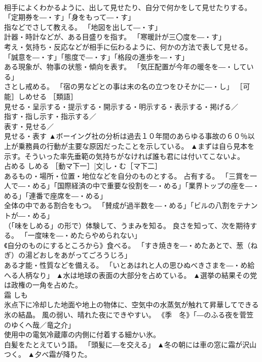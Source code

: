 \documentclass[8pt]{extreport}
\begin{document}
\begin{CJK}{UTF8}{min}
\\	相手によくわかるように、出して見せたり、自分で何かをして見せたりする。 「定期券を―・す」「身をもって―・す」 
\\	指などでさして教える。 「地図を出して―・す」 
\\	計器・時計などが、ある目盛りを指す。 「寒暖計が三〇度を―・す」 
\\	考え・気持ち・反応などが相手に伝わるように、何かの方法で表して見せる。 「誠意を―・す」「態度で―・す」「格段の進歩を―・す」 
\\	ある現象が、物事の状態・傾向を表す。 「気圧配置が今年の暖冬を―・している」 
\\	さとし戒める。 「宿の男などとの事は末の名の立つをひそかに―・し」 ［可能］しめせる ［類語］
\\	見せる・呈示する・提示する・開示する・明示する・表示する・掲げる／
\\	指す・指し示す・指示する／
\\	表す・見せる／
\\	見せる・表す	▲ボーイング社の分析は過去１０年間のあらゆる事故の６０％以上が乗務員の行動が主要な原因だったことを示している。 ▲まずは自ら見本を示す。そういった率先垂範の気持ちがなければ誰も君には付いてこないよ。
\\	占める	しめる	［動マ下一］[文]し・む［マ下二］ 
\\	あるもの・場所・位置・地位などを自分のものとする。 占有する。 「三賞を一人で―・める」「国際経済の中で重要な役割を―・める」「業界トップの座を―・める」「連番で座席を―・める」 
\\	全体の中である割合をもつ。 「賛成が過半数を―・める」「ビルの八割をテナントが―・める」 
\\	（「味をしめる」の形で）体験して、うまみを知る。 良さを知って、次を期待する。 「一度味を―・めたらやめられない」 
\\	《自分のものにするところから》食べる。 「すき焼きを―・めたあとで、葱（ねぎ）の湯どおしをあがってごろうじろ」 
\\	ある才能・性質などを備える。 「いとあはれと人の思ひぬべきさまを―・め給へる人柄なり」	▲水は地球の表面の大部分を占めている。 ▲選挙の結果その党は政権の一角を占めた。
\\	霜	しも	
\\	氷点下に冷却した地面や地上の物体に、空気中の水蒸気が触れて昇華してできる氷の結晶。 風の弱い、晴れた夜にできやすい。 《季　冬》「―のふる夜を菅笠のゆくへ哉／竜之介」 
\\	使用中の電気冷蔵庫の内側に付着する細かい氷。 
\\	白髪をたとえていう語。 「頭髪に―を交える」	▲冬の朝には車の窓に霜が沢山つく。 ▲夕べ霜が降りた。

\end{CJK}
\end{document}
